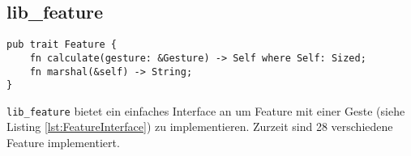\subsection{lib\_feature}
\begin{lstlisting}[label=lst:FeatureInterface,caption={Interface, um ein Feature zu implementieren.}]
pub trait Feature {
    fn calculate(gesture: &Gesture) -> Self where Self: Sized;
    fn marshal(&self) -> String;
}
\end{lstlisting}
\texttt{lib\_feature} bietet ein einfaches Interface an um Feature mit einer Geste (siehe Listing \ref{lst:FeatureInterface}) zu implementieren. Zurzeit sind 28 verschiedene Feature implementiert.